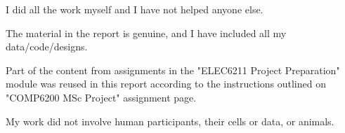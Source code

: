 \begin{StatementofOriginality}
\vskip10pt

\begin{tcolorbox}
I did all the work myself and I have not helped anyone else.
\end{tcolorbox}

\vskip10pt

\begin{tcolorbox}
The material in the report is genuine, and I have included all my data/code/designs.
\end{tcolorbox}

\vskip10pt


\begin{tcolorbox}
Part of the content from assignments in the "ELEC6211 Project Preparation" module was reused in this report according to the instructions outlined on "COMP6200 MSc Project" assignment page.
\end{tcolorbox}

\vskip10pt

\begin{tcolorbox}
My work did not involve human participants, their cells or data, or animals.
\end{tcolorbox}

\end{StatementofOriginality}